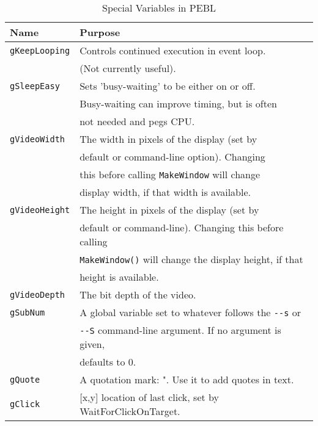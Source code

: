 \begin{table}[htbp]
\caption{Special Variables in PEBL}

\begin{tabular}{ll}
\toprule
\textbf{Name}&\textbf{Purpose}\\
\midrule
\verb+gKeepLooping+ & Controls continued execution in event loop. \\
 &           (Not currently useful).\\
\addlinespace[.2cm]
\verb+gSleepEasy+      &Sets 'busy-waiting' to be either on or off.\\
                       &Busy-waiting can improve timing, but is often\\
                       &not needed and pegs CPU.   \\
\verb+gVideoWidth+  &	The width in pixels of the display (set by\\
             &  default or command-line option). Changing \\
             &  this before calling \verb+MakeWindow+ will change \\
             &  display width, if that width is available. \\
\addlinespace[.2cm]
\verb+gVideoHeight+ & 	The height in pixels of the display (set by\\
             & 	default or command-line). Changing this before calling \\
             &  \verb+MakeWindow()+ will change the display height, if that \\
             &  height is available.\\
\addlinespace[.2cm]
\verb+gVideoDepth+    &      	The bit depth of the video.\\

\addlinespace[.2cm]
\verb+gSubNum+      &  A global variable set to whatever follows the \verb+--s+ or \\
             & \verb+--S+ command-line argument.  If no argument is given, \\
             & defaults to 0.\\
\verb+gQuote+ &A quotation mark: ".  Use it to add quotes in text.\\
\verb+gClick+ &[x,y] location of last click, set by WaitForClickOnTarget.\\


\bottomrule
\end{tabular}
\label{tab:special}
\end{table}






